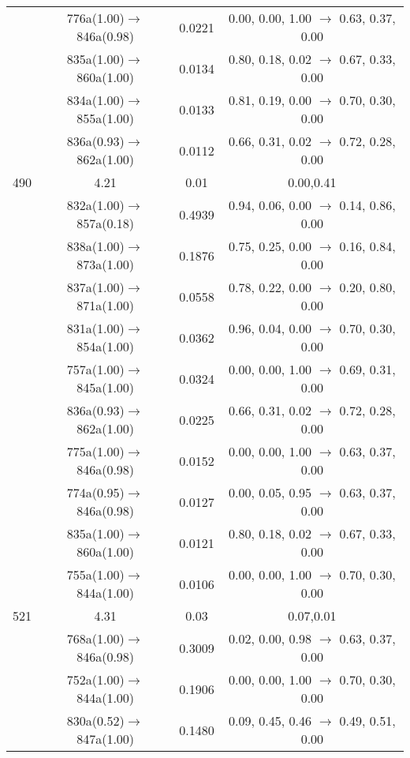 \documentclass[10pt,a4paper]{article}
\begin{document}
\begin{longtable}{c|c|c|c}
 	& 776a(1.00)$\rightarrow$846a(0.98) &	 0.0221 &	 0.00, 0.00, 1.00 $\rightarrow$ 0.63, 0.37, 0.00 \\ 
 	& 835a(1.00)$\rightarrow$860a(1.00) &	 0.0134 &	 0.80, 0.18, 0.02 $\rightarrow$ 0.67, 0.33, 0.00 \\ 
 	& 834a(1.00)$\rightarrow$855a(1.00) &	 0.0133 &	 0.81, 0.19, 0.00 $\rightarrow$ 0.70, 0.30, 0.00 \\ 
 	& 836a(0.93)$\rightarrow$862a(1.00) &	 0.0112 &	 0.66, 0.31, 0.02 $\rightarrow$ 0.72, 0.28, 0.00 \\ 
 \hline490 &	 4.21 &	 0.01 &	 0.00,0.41 \\ 
  	& 832a(1.00)$\rightarrow$857a(0.18) &	 0.4939 &	 0.94, 0.06, 0.00 $\rightarrow$ 0.14, 0.86, 0.00 \\ 
 	& 838a(1.00)$\rightarrow$873a(1.00) &	 0.1876 &	 0.75, 0.25, 0.00 $\rightarrow$ 0.16, 0.84, 0.00 \\ 
 	& 837a(1.00)$\rightarrow$871a(1.00) &	 0.0558 &	 0.78, 0.22, 0.00 $\rightarrow$ 0.20, 0.80, 0.00 \\ 
 	& 831a(1.00)$\rightarrow$854a(1.00) &	 0.0362 &	 0.96, 0.04, 0.00 $\rightarrow$ 0.70, 0.30, 0.00 \\ 
 	& 757a(1.00)$\rightarrow$845a(1.00) &	 0.0324 &	 0.00, 0.00, 1.00 $\rightarrow$ 0.69, 0.31, 0.00 \\ 
 	& 836a(0.93)$\rightarrow$862a(1.00) &	 0.0225 &	 0.66, 0.31, 0.02 $\rightarrow$ 0.72, 0.28, 0.00 \\ 
 	& 775a(1.00)$\rightarrow$846a(0.98) &	 0.0152 &	 0.00, 0.00, 1.00 $\rightarrow$ 0.63, 0.37, 0.00 \\ 
 	& 774a(0.95)$\rightarrow$846a(0.98) &	 0.0127 &	 0.00, 0.05, 0.95 $\rightarrow$ 0.63, 0.37, 0.00 \\ 
 	& 835a(1.00)$\rightarrow$860a(1.00) &	 0.0121 &	 0.80, 0.18, 0.02 $\rightarrow$ 0.67, 0.33, 0.00 \\ 
 	& 755a(1.00)$\rightarrow$844a(1.00) &	 0.0106 &	 0.00, 0.00, 1.00 $\rightarrow$ 0.70, 0.30, 0.00 \\ 
 \hline521 &	 4.31 &	 0.03 &	 0.07,0.01 \\ 
  	& 768a(1.00)$\rightarrow$846a(0.98) &	 0.3009 &	 0.02, 0.00, 0.98 $\rightarrow$ 0.63, 0.37, 0.00 \\ 
 	& 752a(1.00)$\rightarrow$844a(1.00) &	 0.1906 &	 0.00, 0.00, 1.00 $\rightarrow$ 0.70, 0.30, 0.00 \\ 
 	& 830a(0.52)$\rightarrow$847a(1.00) &	 0.1480 &	 0.09, 0.45, 0.46 $\rightarrow$ 0.49, 0.51, 0.00 \\ 

\end{longtable}
\end{document}
